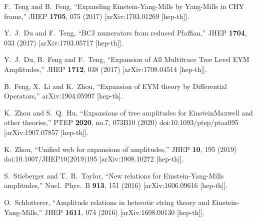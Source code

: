 \documentclass[preprint,showpacs,onecolumn,nofootinbib]{revtex4}
\begin{document}
\begin{thebibliography}{}
  F.~Teng and B.~Feng,
  ``Expanding Einstein-Yang-Mills by Yang-Mills in CHY frame,''
  JHEP {\bf 1705}, 075 (2017)
  [arXiv:1703.01269 [hep-th]].

  Y.~J.~Du and F.~Teng,
  ``BCJ numerators from reduced Pfaffian,''
  JHEP {\bf 1704}, 033 (2017)
  [arXiv:1703.05717 [hep-th]].


  Y.~J.~Du, B.~Feng and F.~Teng,
  ``Expansion of All Multitrace Tree Level EYM Amplitudes,''
  JHEP {\bf 1712}, 038 (2017)
  [arXiv:1708.04514 [hep-th]].

  B.~Feng, X.~Li and K.~Zhou,
  ``Expansion of EYM theory by Differential Operators,''
  arXiv:1904.05997 [hep-th].

K.~Zhou and S.~Q.~Hu,
``Expansions of tree amplitudes for Einstein\textendash{}Maxwell and other theories,''
PTEP \textbf{2020}, no.7, 073B10 (2020)
doi:10.1093/ptep/ptaa095
[arXiv:1907.07857 [hep-th]].

K.~Zhou,
``Unified web for expansions of amplitudes,''
JHEP \textbf{10}, 195 (2019)
doi:10.1007/JHEP10(2019)195
[arXiv:1908.10272 [hep-th]].


  S.~Stieberger and T.~R.~Taylor,
  ``New relations for Einstein-Yang-Mills amplitudes,''
  Nucl.\ Phys.\ B {\bf 913}, 151 (2016)
  [arXiv:1606.09616 [hep-th]].


  O.~Schlotterer,
  ``Amplitude relations in heterotic string theory and Einstein-Yang-Mills,''
  JHEP {\bf 1611}, 074 (2016)
  [arXiv:1608.00130 [hep-th]].



\end{thebibliography}
\end{document}
